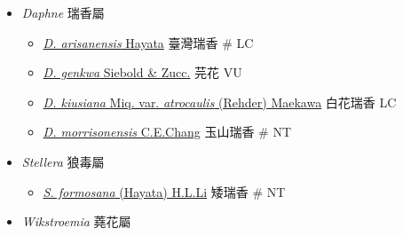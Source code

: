 
  \begin{itemize}
 \item[] \textit{Daphne} 瑞香屬
                                
  \begin{itemize}
        \item[] \href{http://www.theplantlist.org/tpl1.1/search?q=Daphne+arisanensis}{\textit{D. arisanensis} Hayata}   臺灣瑞香  \# LC
        \item[] \href{http://www.theplantlist.org/tpl1.1/search?q=Daphne+genkwa}{\textit{D. genkwa} Siebold \& Zucc.}   芫花   VU
        \item[] \href{http://www.theplantlist.org/tpl1.1/search?q=Daphne+kiusiana+var.+atrocaulis}{\textit{D. kiusiana} Miq. var. \textit{atrocaulis} (Rehder) Maekawa}   白花瑞香   LC
        \item[] \href{http://www.theplantlist.org/tpl1.1/search?q=Daphne+morrisonensis}{\textit{D. morrisonensis} C.E.Chang}   玉山瑞香  \# NT
  \end{itemize}
 \item[] \textit{Stellera} 狼毒屬
                                
  \begin{itemize}
        \item[] \href{http://www.theplantlist.org/tpl1.1/search?q=Stellera+formosana}{\textit{S. formosana} (Hayata) H.L.Li}   矮瑞香  \# NT
  \end{itemize}
 \item[] \textit{Wikstroemia} 蕘花屬
                                

\end{itemize}
